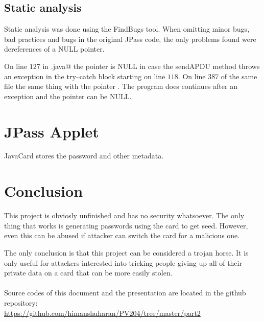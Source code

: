 \documentclass[paper=a4, fontsize=12pt]{scrartcl}
\begin{document}
\subsection{Static analysis}
Static analysis was done using the FindBugs tool.
When omitting minor bugs, bad practices and bugs in the original JPass code, the only problems found were dereferences of a NULL pointer.

On line $127$ in \verb@CardInterface.java@ the pointer \verb@response@ is NULL in case the sendAPDU method throws an exception in the try--catch block starting on line $118$.
On line $387$ of the same file the same thing with the pointer \verb@encrypted@. The program does continues after an exception and the pointer can be NULL.

\section{JPass Applet}
JavaCard stores the password and other metadata.%

\section{Conclusion}
This project is obviosly unfinished and has no security whatsoever.
The only thing that works is generating passwords using the card to get seed.
However, even this can be abused if attacker can switch the card for a malicious one.

The only conclusion is that this project can be considered a trojan horse.
It is only useful for attackers interested into tricking people giving up all of their private data on a card that can be more easily stolen.
\\
\\
Source codes of this document and the presentation are located in the github repository:
\\ \url{https://github.com/himanshuharan/PV204/tree/master/part2}
\end{document}
